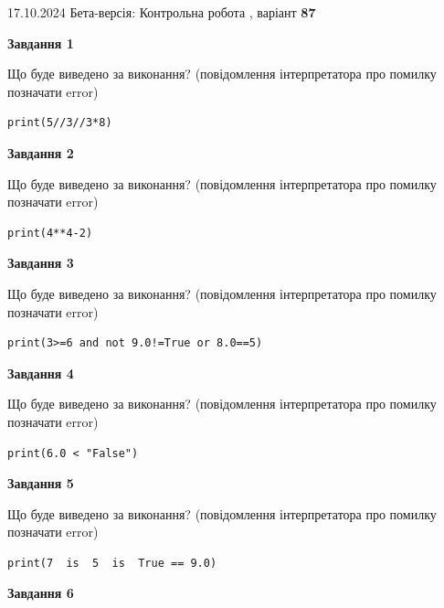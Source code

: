 \documentclass[12pt, ukrainian]{article}
\begin{document}
{\Large{17.10.2024 Бета-версія: Контрольна робота , варіант  \No \textbf { 87 }\par}}
{
\begin {large}
{\begin {center}\textbf{Завдання 1}\end {center}}

Що буде виведено за виконання? (повідомлення інтерпретатора про помилку позначати error)\par
\begin{verbatim}
print(5//3//3*8)
\end{verbatim}

{\begin {center}\textbf{Завдання 2}\end {center}}

Що буде виведено за виконання? (повідомлення інтерпретатора про помилку позначати error)\par
\begin{verbatim}
print(4**4-2)
\end{verbatim}

{\begin {center}\textbf{Завдання 3}\end {center}}

Що буде виведено за виконання? (повідомлення інтерпретатора про помилку позначати error)\par
\begin{verbatim}
print(3>=6 and not 9.0!=True or 8.0==5)
\end{verbatim}

{\begin {center}\textbf{Завдання 4}\end {center}}

Що буде виведено за виконання? (повідомлення інтерпретатора про помилку позначати error)\par
\begin{verbatim}
print(6.0 < "False")
\end{verbatim}

{\begin {center}\textbf{Завдання 5}\end {center}}

Що буде виведено за виконання? (повідомлення інтерпретатора про помилку позначати error)\par
\begin{verbatim}
print(7  is  5  is  True == 9.0)
\end{verbatim}

{\begin {center}\textbf{Завдання 6}\end {center}}


\end{large}}
\end{document}
